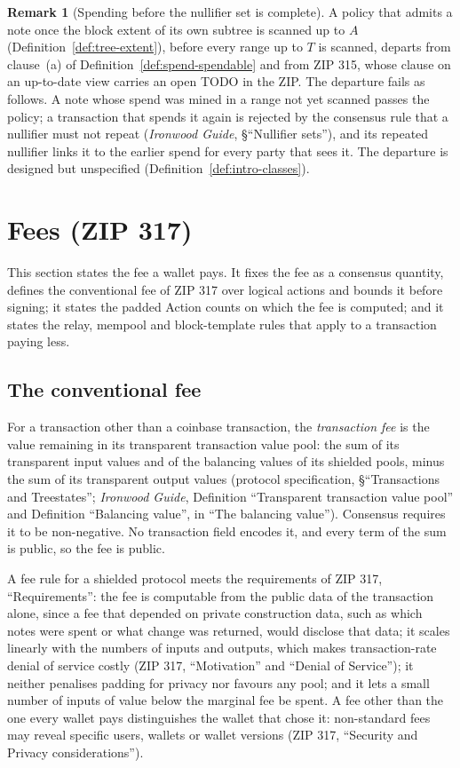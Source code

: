 \documentclass[11pt,a4paper]{article}
\theoremstyle{definition}
\newtheorem{remark}[theorem]{Remark}
\begin{document}
\begin{remark}[Spending before the nullifier set is complete]
\label{rem:spend-before-sync}
A policy that admits a note once the block extent of its own subtree is
scanned up to $A$ (Definition~\ref{def:tree-extent}), before every range up
to $T$ is scanned, departs from clause~(a) of
Definition~\ref{def:spend-spendable} and from ZIP 315, whose clause on an
up-to-date view carries an open TODO in the ZIP. The departure fails as
follows. A note whose spend was mined in a range not yet scanned passes the
policy; a transaction that spends it again is rejected by the consensus rule
that a nullifier must not repeat (\emph{Ironwood Guide}, \S``Nullifier
sets''), and its repeated nullifier links it to the earlier spend for every
party that sees it. The departure is designed but unspecified
(Definition~\ref{def:intro-classes}).
\end{remark}

\section{Fees (ZIP 317)}\label{sec:fees}

This section states the fee a wallet pays. It fixes the fee as a consensus
quantity, defines the conventional fee of ZIP 317 over logical actions and
bounds it before signing; it states the padded Action counts on which the fee
is computed; and it states the relay, mempool and block-template rules that
apply to a transaction paying less.

\subsection{The conventional fee}\label{sec:fees-conventional}

For a transaction other than a coinbase transaction, the \emph{transaction
fee} is the value remaining in its transparent transaction value pool: the
sum of its transparent input values and of the balancing values of its
shielded pools, minus the sum of its transparent output values (protocol
specification, \S``Transactions and Treestates''; \emph{Ironwood Guide},
Definition ``Transparent transaction value pool'' and Definition ``Balancing
value'', in ``The balancing value''). Consensus requires it to be
non-negative. No transaction field encodes it, and every term of the sum is
public, so the fee is public.

A fee rule for a shielded protocol meets the requirements of ZIP 317,
``Requirements'': the fee is computable from the public data of the
transaction alone, since a fee that depended on private construction data,
such as which notes were spent or what change was returned, would disclose
that data; it scales linearly with the numbers of inputs and outputs, which
makes transaction-rate denial of service costly (ZIP 317, ``Motivation'' and
``Denial of Service''); it neither penalises padding for privacy nor
favours any pool; and it lets a small number of inputs of value below the
marginal fee be spent. A fee other than the one every wallet pays distinguishes
the wallet that chose it: non-standard fees may reveal specific users,
wallets or wallet versions (ZIP 317, ``Security and Privacy
considerations'').
\end{document}
